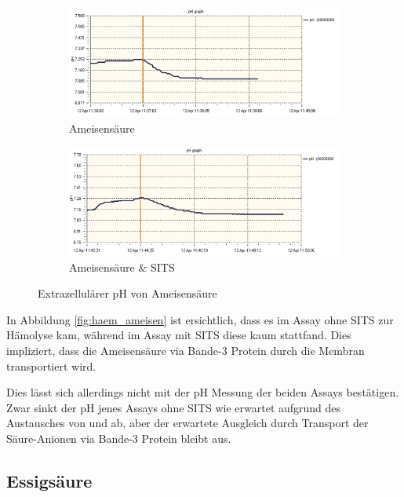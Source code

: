 \documentclass[a4paper,german]{scrreprt}
\begin{document}
\begin{figure}
	\centering
	\begin{subfigure}{.5\textwidth}
		\centering
		\includegraphics[width=\linewidth]{img/ph_ameisen.png}
		\caption{Ameisensäure}
	\end{subfigure}%
	\begin{subfigure}{.5\textwidth}
		\centering
		\includegraphics[width=\linewidth]{img/ph_ameisen_sits.png}
		\caption{Ameisensäure \& SITS}
	\end{subfigure}
	\caption{Extrazellulärer pH von Ameisensäure}
	\label{fig:ph_ameisen}
\end{figure}

In Abbildung \ref{fig:haem_ameisen} ist ersichtlich, dass es im Assay ohne SITS
zur Hämolyse kam, während im Assay mit SITS diese kaum stattfand. Dies
impliziert, dass die Ameisensäure via Bande-3 Protein durch die Membran
transportiert wird.

Dies lässt sich allerdings nicht mit der pH Messung der beiden Assays
bestätigen. Zwar sinkt der pH jenes Assays ohne SITS wie erwartet aufgrund des
Austausches von  und  ab, aber der erwartete Ausgleich durch
Transport der Säure-Anionen via Bande-3 Protein bleibt aus.

\subsection{Essigsäure}
\end{document}
